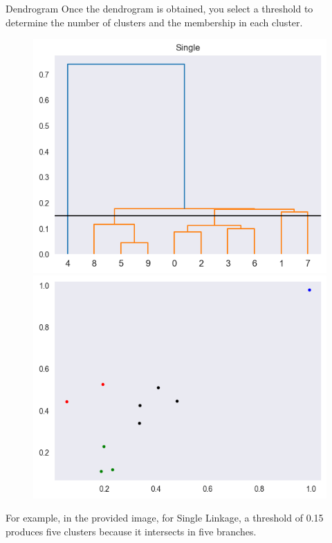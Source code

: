 \documentclass{beamer}
\begin{document}
\begin{frame}{Dendrogram}
 Once the dendrogram is  obtained, you select a threshold to determine the number of clusters and the membership in each cluster. \\
   \begin{figure}
        \begin{minipage}[b]{0.48\textwidth}
            \includegraphics[width=\textwidth]{single_link_image.png}
         \end{minipage}
        \hfill
        \begin{minipage}[b]{0.48\textwidth}
            \includegraphics[width=\textwidth]{assigned_groups_single_link.png}
        \end{minipage}
    \end{figure}

 For example, in the provided image, for Single Linkage, a threshold of 0.15 produces five clusters because it intersects in five branches.
\end{frame}
\end{document}
